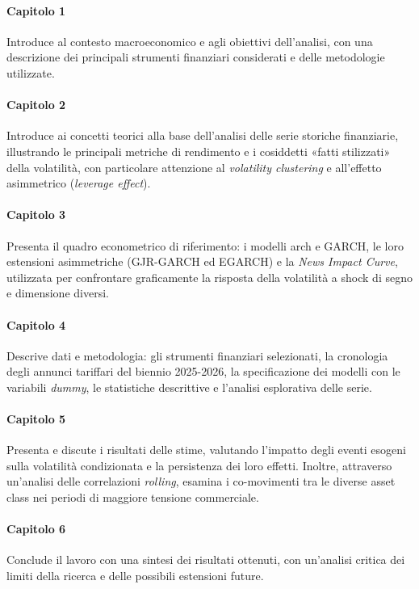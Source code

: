 \paragraph{Capitolo 1}
Introduce al contesto macroeconomico e agli obiettivi dell'analisi, con una descrizione dei principali strumenti finanziari considerati e delle metodologie utilizzate.

\paragraph{Capitolo 2}
Introduce ai concetti teorici alla base dell'analisi delle serie storiche finanziarie, illustrando le principali metriche di rendimento e i cosiddetti «fatti stilizzati» della volatilità, con particolare attenzione al \emph{volatility clustering} e all'effetto asimmetrico (\emph{leverage effect}). 

\paragraph{Capitolo 3}
Presenta il quadro econometrico di riferimento: i modelli \gls{arch} e GARCH, le loro estensioni asimmetriche (GJR-GARCH ed EGARCH) e la \emph{News Impact Curve}, utilizzata per confrontare graficamente la risposta della volatilità a shock di segno e dimensione diversi.

\paragraph{Capitolo 4}
Descrive dati e metodologia: gli strumenti finanziari selezionati, la cronologia degli annunci tariffari del biennio 2025-2026, la specificazione dei modelli con le variabili \emph{dummy}, le statistiche descrittive e l'analisi esplorativa delle serie. 

\paragraph{Capitolo 5}
Presenta e discute i risultati delle stime, valutando l'impatto degli eventi esogeni sulla volatilità condizionata e la persistenza dei loro effetti. Inoltre, attraverso un'analisi delle correlazioni \emph{rolling}, esamina i co-movimenti tra le diverse asset class nei periodi di maggiore tensione commerciale.

\paragraph{Capitolo 6}
Conclude il lavoro con una sintesi dei risultati ottenuti, con un'analisi critica dei limiti della ricerca e delle possibili estensioni future.


